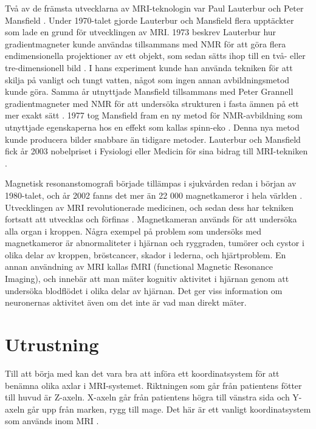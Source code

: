 \documentclass[11pt, a4paper]{article}
\begin{document}
Två av de främsta utvecklarna av MRI-teknologin var Paul Lauterbur och Peter Mansfield \parencite{mri_nobelpris_pressmeddelande}. Under 1970-talet gjorde Lauterbur och Mansfield flera upptäckter som lade en grund för utvecklingen av MRI. 1973 beskrev Lauterbur hur gradientmagneter kunde användas tillsammans med NMR för att göra flera endimensionella projektioner av ett objekt, som sedan sätts ihop till en två- eller tre-dimensionell bild \parencite{lauterbur_image_formation}. I hans experiment kunde han använda tekniken för att skilja på vanligt och tungt vatten, något som ingen annan avbildningsmetod kunde göra. Samma år utnyttjade Mansfield tillsammans med Peter Grannell gradientmagneter med NMR för att undersöka strukturen i fasta ämnen på ett mer exakt sätt \parencite{mansfield_solid_structure}. 1977 tog Mansfield fram en ny metod för NMR-avbildning som utnyttjade egenskaperna hos en effekt som kallas spinn-eko \parencite{mansfield_fast_image_formation}. Denna nya metod kunde producera bilder snabbare än tidigare metoder. Lauterbur och Mansfield fick år 2003 nobelpriset i Fysiologi eller Medicin för sina bidrag till MRI-tekniken \parencite{mri_nobelpris_pressmeddelande}.

Magnetisk resonanstomografi började tillämpas i sjukvården redan i början av 1980-talet, och år 2002 fanns det mer än 22 000 magnetkameror i hela världen \parencite{mri_nobelpris_pressmeddelande}. Utvecklingen av MRI revolutionerade medicinen, och sedan dess har tekniken fortsatt att utvecklas och förfinas \parencite{mri_facts}. Magnetkameran används för att undersöka alla organ i kroppen. Några exempel på problem som undersöks med magnetkameror är abnormaliteter i hjärnan och ryggraden, tumörer och cystor i olika delar av kroppen, bröstcancer, skador i lederna, och hjärtproblem. En annan användning av MRI kallas fMRI (functional Magnetic Resonance Imaging), och innebär att man mäter kognitiv aktivitet i hjärnan genom att undersöka blodflödet i olika delar av hjärnan. Det ger viss information om neuronernas aktivitet även om det inte är vad man direkt mäter.

\clearpage
\section{Utrustning}
Till att börja med kan det vara bra att införa ett koordinatsystem för att benämna olika axlar i MRI-systemet. Riktningen som går från patientens fötter till huvud är Z-axeln. X-axeln går från patientens högra till vänstra sida och Y-axeln går upp från marken, rygg till mage. Det här är ett vanligt koordinatsystem som används inom MRI \parencite{mri_for_radiologists}.
\end{document}
